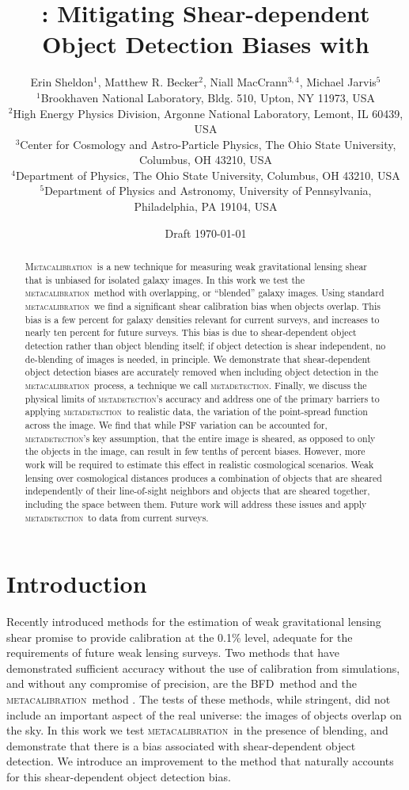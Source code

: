 \documentclass[fleqn,useAMS,usenatbib]{mnras}
\title[\Mdet]{\Mdet: Mitigating Shear-dependent Object Detection Biases with \Mcal}
\author[Sheldon et~al.]{Erin Sheldon$^1$, Matthew R. Becker$^2$,
Niall MacCrann$^{3,4}$, Michael Jarvis$^5$
  \\$^1$Brookhaven National Laboratory, Bldg. 510, Upton, NY 11973, USA
  \\$^2$High Energy Physics Division, Argonne National Laboratory, Lemont, IL 60439, USA
  \\$^3$Center for Cosmology and Astro-Particle Physics, The Ohio State University, Columbus, OH 43210, USA
  \\$^4$Department of Physics, The Ohio State University, Columbus, OH 43210, USA
  \\$^5$Department of Physics and Astronomy, University of Pennsylvania, Philadelphia, PA 19104, USA
}
\newcommand{\mcal}{\textsc{metacalibration}}
\newcommand{\mdet}{\textsc{metadetection}}
\newcommand{\Mcal}{\textsc{Metacalibration}}
\newcommand{\bfd}{\textsc{BFD}}
\begin{document}
\date{Draft \today}
\maketitle

\begin{abstract}

\Mcal\ is a new technique for measuring weak gravitational lensing shear that
is unbiased for isolated galaxy images.  In this work we test the \mcal\ method
with overlapping, or ``blended'' galaxy images.  Using standard \mcal\ we find
a significant shear calibration bias when objects overlap. This bias is a few
percent for galaxy densities relevant for current surveys, and increases to
nearly ten percent for future surveys.  This bias is due to shear-dependent
object detection rather than object blending itself; if object detection is shear
independent, no de-blending of images is needed, in principle.
We demonstrate that shear-dependent object detection biases are accurately
removed when including object detection in the \mcal\ process, a technique we call
\mdet. Finally, we discuss the physical limits of \mdet's accuracy and address one
of the primary barriers to applying \mdet\ to realistic data, the variation of the
point-spread function across the image. We find that while PSF variation can be
accounted for, \mdet's key assumption, that the entire image is sheared, as opposed to
only the objects in the image, can result in few tenths of percent biases. However,
more work will be required to estimate this effect in realistic cosmological scenarios.
Weak lensing over cosmological distances produces a combination of objects that
are sheared independently of their line-of-sight neighbors and objects that are
sheared together, including the space between them. Future work will address these
issues and apply \mdet\ to data from current surveys.

\end{abstract}

\section{Introduction}


Recently introduced methods for the estimation of weak gravitational lensing
shear promise to provide calibration at the 0.1\% level, adequate for the
requirements of future weak lensing surveys.  Two methods that have
demonstrated sufficient accuracy without the use of calibration from
simulations, and without any compromise of precision, are the \bfd\ method
\citep{BernBFD2016} and the \mcal\ method \citep{HuffMcal2017,SheldonMcal2017}.
The tests of these methods, while stringent, did not include an important
aspect of the real universe: the images of objects overlap on the sky. In this
work we test \mcal\ in the presence of blending, and demonstrate that there is
a bias associated with shear-dependent object detection. We introduce an improvement
to the method that naturally accounts for this shear-dependent object detection bias.
\end{document}
